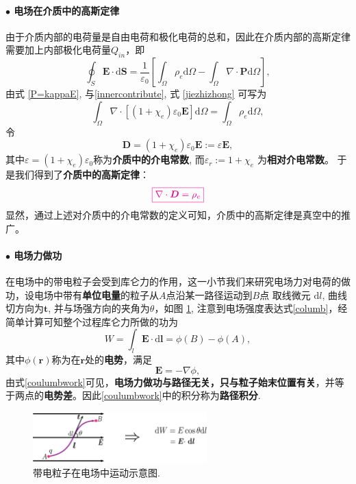 \documentclass[10pt,reqno, final]{ctexart}
\begin{document}
\paragraph{$\bullet$ 电场在介质中的高斯定律} 由于介质内部的电荷量是自由电荷和极化电荷的总和，因此在介质内部的高斯定律需要加上内部极化电荷量$Q_{in}$，即
\begin{equation}\label{jiezhizhong}
\oint_S \bm{E}\cdot \mathrm{d}\bm{S} = \frac{1}{\varepsilon_0}\left[ \int_\Omega \rho_e \mathrm{d}\Omega-\int_\Omega \nabla\cdot\bm{P} \mathrm{d}\Omega \right],
\end{equation} 
由式 	\eqref{P=kappaE}, 与\eqref{innercontribute}, 式	\eqref{jiezhizhong} 可写为
\begin{equation}
\int_{\Omega} \nabla\cdot[(1+\chi_e)\varepsilon_0\bm{E}]\mathrm{d}\Omega = \int_\Omega \rho_e \mathrm{d}\Omega,
\end{equation}
令 
$$\bm{D} = (1+\chi_e)\varepsilon_0\bm{E}:= \varepsilon \bm{E},$$
其中$\varepsilon=(1+\chi_e)\varepsilon_0$称为\textbf{介质中的介电常数}, 而$\varepsilon_r:=1+\chi_e$ 为\textbf{相对介电常数}。
于是我们得到了\textbf{介质中的高斯定律}：
\begin{equation}\label{gaussThmgeneral}
\color{magenta}{\boxed{\nabla\cdot \bm{D} = \rho_e }} 
\end{equation}
显然，通过上述对介质中的介电常数的定义可知，介质中的高斯定律是真空中的推广。

\newpage

\paragraph{$\bullet$ 电场力做功} 在电场中的带电粒子会受到库仑力的作用，这一小节我们来研究电场力对电荷的做功，设电场中带有\textbf{单位电量}的粒子从$A$点沿某一路径运动到$B$点 取线微元 $\mathrm{d}l$, 曲线切方向为$\bm{t}$, 并与场强方向的夹角为$\theta$，如图 \ref{dianchanglizuogong}, 注意到电场强度表达式\eqref{columb}，经简单计算可知整个过程库仑力所做的功为
\begin{equation}\label{coulumbwork}
W = \int_{l}\bm{E}\cdot\mathrm{d}\bm{l} = \phi(B) - \phi(A),
\end{equation}
其中$\phi(\bm{r})$称为在$\bm{r}$处的\textbf{电势}，满足
$$ \bm{E} = -\nabla\phi, $$
由式\eqref{coulumbwork}可见，\textbf{电场力做功与路径无关，只与粒子始末位置有关}，并等于两点的\textbf{电势差}。因此\eqref{coulumbwork}中的积分称为\textbf{路径积分}. 

\begin{figure}[htp]
	\centering
	\includegraphics[width=0.6\textwidth]{Figures/dianchanglizuogong}
	\caption {带电粒子在电场中运动示意图. }
	\label{dianchanglizuogong}
\end{figure}
\end{document}
